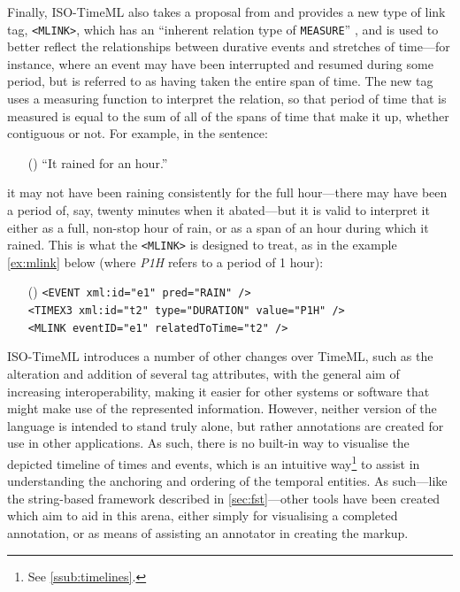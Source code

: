 \documentclass[a4paper,12pt,leqno]{article}
\newcommand{\ipp}{(\refstepcounter{equation}\theequation)}
\begin{document}
\label{other:iso-mlink}Finally, ISO-TimeML also takes a proposal from \citep{bunt2010annotating} and provides a new type of link tag, \verb|<MLINK>|, which has an ``inherent relation type of \verb|MEASURE|'' \citep[p. 396]{pustejovsky2010iso}, and is used to better reflect the relationships between durative events and stretches of time---for instance, where an event may have been interrupted and resumed during some period, but is referred to as having taken the entire span of time. The new tag uses a measuring function \citep{bunt1985mass} to interpret the relation, so that period of time that is measured is equal to the sum of all of the spans of time that make it up, whether contiguous or not. For example, in the sentence:
\begin{itemize}
	\item[\ipp] ``It rained for an hour.''
\end{itemize}
it may not have been raining consistently for the full hour---there may have been a period of, say, twenty minutes when it abated---but it is valid to interpret it either as a full, non-stop hour of rain, or as a span of an hour during which it rained. This is what the \verb|<MLINK>| is designed to treat, as in the example \cref{ex:mlink} below (where \textit{P1H} refers to a period of 1 hour):
\begin{itemize}
	\item[\ipp\label{ex:mlink}] \verb|<EVENT xml:id="e1" pred="RAIN" />|\\\verb|<TIMEX3 xml:id="t2" type="DURATION" value="P1H" />|\\\verb|<MLINK eventID="e1" relatedToTime="t2" />|
\end{itemize}
ISO-TimeML introduces a number of other changes over TimeML, such as the alteration and addition of several tag attributes, with the general aim of increasing interoperability, making it easier for other systems or software that might make use of the represented information. However, neither version of the language is intended to stand truly alone, but rather annotations are created for use in other applications. As such, there is no built-in way to visualise the depicted timeline of times and events, which is an intuitive way\footnote{See \cref{ssub:timelines}.} to assist in understanding the anchoring and ordering of the temporal entities. As such---like the string-based framework described in \cref{sec:fst}---other tools have been created which aim to aid in this arena, either simply for visualising a completed annotation, or as means of assisting an annotator in creating the markup.
\end{document}
